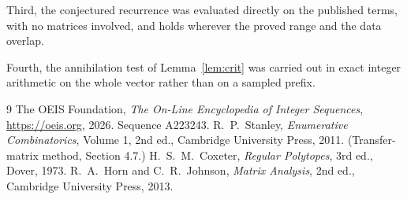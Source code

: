 \documentclass[11pt,a4paper]{article}
\theoremstyle{plain}
\theoremstyle{definition}
\begin{document}
Third, the conjectured recurrence was evaluated directly on the published terms, with no
matrices involved, and holds wherever the proved range and the data overlap.

Fourth, the annihilation test of Lemma~\ref{lem:crit} was carried out in exact integer
arithmetic on the whole vector rather than on a sampled prefix.

\begin{thebibliography}{9}
 The OEIS Foundation, \emph{The On-Line Encyclopedia of Integer
Sequences}, \url{https://oeis.org}, 2026. Sequence A223243.
 R.~P.~Stanley, \emph{Enumerative Combinatorics}, Volume 1, 2nd ed.,
Cambridge University Press, 2011. (Transfer-matrix method, Section 4.7.)
 H.~S.~M.~Coxeter, \emph{Regular Polytopes}, 3rd ed., Dover, 1973.
 R.~A.~Horn and C.~R.~Johnson, \emph{Matrix Analysis}, 2nd ed., Cambridge
University Press, 2013.
\end{thebibliography}
\end{document}

